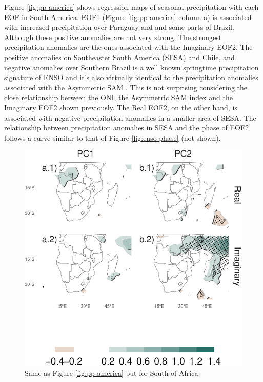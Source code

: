 \documentclass[smallextended]{svjour3}       %
\begin{document}
Figure \ref{fig:pp-america} shows regression maps of seasonal precipitation with each EOF in South America. EOF1 (Figure \ref{fig:pp-america} column a) is associated with increased precipitation over Paraguay and and some parts of Brazil. Although these positive anomalies are not very strong. The strongest precipitation anomalies are the ones associated with the Imaginary EOF2. The positive anomalies on Southeaster South America (SESA) and Chile, and negative anomalies over Southern Brazil is a well known springtime precipitation signature of ENSO \citep{cai2020a} and it's also virtually identical to the precipitation anomalies associated with the Asymmetric SAM \citep{campitelli2021}. This is not surprising considering the close relationship between the ONI, the Asymmetric SAM index and the Imaginary EOF2 shown previously. The Real EOF2, on the other hand, is associated with negative precipitation anomalies in a smaller area of SESA. The relationship between precipitation anomalies in SESA and the phase of EOF2 follows a curve similar to that of Figure \ref{fig:enso-phase} (not shown).



\begin{figure}
\centering
\includegraphics{../figures/pp-africa-1.pdf}
\caption{\label{fig:pp-africa}Same as Figure \ref{fig:pp-america} but for South of Africa.}
\end{figure}
\end{document}
